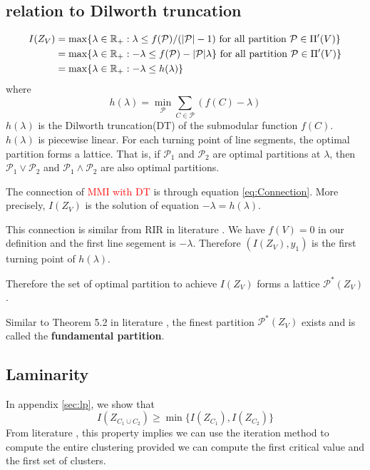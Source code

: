 \documentclass{article}
\def\R{\mathbb{R}}
\def\P{\mathcal{P}}
\DeclarePairedDelimiter\abs{\lvert}{\rvert}
\def\red#1{\textcolor{red}{#1}}
\theoremstyle{definition}
\begin{document}
\subsection{relation to Dilworth truncation}
\begin{align}
I(Z_V) &= \max\{ \lambda \in \R_+: \lambda \leq f(\P)/(\abs{\P} - 1) \text{ for all partition } \P \in \Pi'(V)\} \\
& = \max\{ \lambda \in \R_+:  -\lambda \leq f(\P) - \abs{\P} \lambda \} \text{ for all partition } \P \in \Pi'(V)\} \\
\label{eq:Connection}& = \max\{ \lambda \in \R_+: -\lambda \leq h(\lambda)\}
\end{align}
where 
\begin{equation}\label{eq:hLambda}
h(\lambda) = \min_{\P} \sum_{C\in \P} (f(C)-\lambda)
\end{equation}
$h(\lambda)$ is the Dilworth truncation(DT) of the submodular function $f(C)$. $h(\lambda)$
is piecewise linear. For each turning point of line segments, the optimal partition forms a lattice. That is, if $\P_1$ and $\P_2$ are optimal partitions at $\lambda$, then $\P_1\vee \P_2$ and $\P_1 \wedge \P_2$ are also optimal partitions.

The connection of \red{MMI with DT} is through equation \eqref{eq:Connection}. More precisely, $I(Z_V)$
is the solution of equation $-\lambda = h(\lambda)$.

This connection is similar from RIR in literature \cite{ic}. We have $f(V)=0$ in our definition and the first line segement is $-\lambda$. Therefore
$(I(Z_V),  y_1)$ is the first turning point of $h(\lambda)$.

Therefore the set of optimal partition to achieve $I(Z_V)$ forms a lattice $\P^*(Z_V)$.

Similar to Theorem 5.2 in literature \cite{ska}, the finest partition $\P^*(Z_V)$ exists and is called the 
\textbf{fundamental partition}.

\subsection{Laminarity}
In appendix \ref{sec:lp}, we show that
\begin{equation}\label{eq:P}
I(Z_{C_1 \cup C_2}) \geq \min\{ I(Z_{C_1}), I(Z_{C_2})\}
\end{equation}
From literature \cite{ic}, this property implies we can use the iteration method to compute the entire clustering
provided we can compute the first critical value and the first set of clusters.
\end{document}
